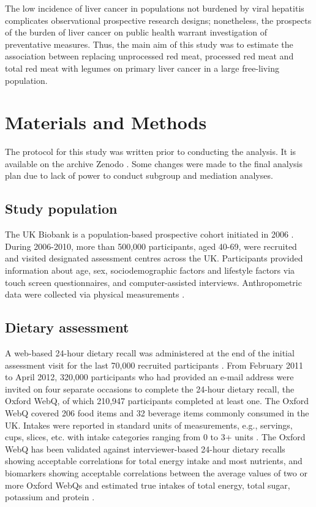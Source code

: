 \documentclass[
]{article}
\begin{document}
The low incidence of liver cancer in populations not burdened by viral
hepatitis complicates observational prospective research designs;
nonetheless, the prospects of the burden of liver cancer on public
health warrant investigation of preventative measures. Thus, the main
aim of this study was to estimate the association between replacing
unprocessed red meat, processed red meat and total red meat with legumes
on primary liver cancer in a large free-living population.

\hypertarget{sec2}{%
\section{Materials and Methods}\label{sec2}}

\noindent The protocol for this study was written prior to conducting
the analysis. It is available on the archive Zenodo \autocite{protocol}. Some
changes were made to the final analysis plan due to lack of power to
conduct subgroup and mediation analyses.

\hypertarget{subsec1}{%
\subsection{Study population}\label{subsec1}}

The UK Biobank is a population-based prospective cohort initiated in
2006 \autocite{sudlow2015}. During 2006-2010, more than 500,000 participants,
aged 40-69, were recruited and visited designated assessment centres
across the UK. Participants provided information about age, sex,
sociodemographic factors and lifestyle factors via touch screen
questionnaires, and computer-assisted interviews. Anthropometric data
were collected via physical measurements \autocite{RN113}.

\hypertarget{subsec2}{%
\subsection{Dietary assessment}\label{subsec2}}

A web-based 24-hour dietary recall was administered at the end of the
initial assessment visit for the last 70,000 recruited participants
\autocite{RN115}. From February 2011 to April 2012, 320,000 participants who had
provided an e-mail address were invited on four separate occasions to
complete the 24-hour dietary recall, the Oxford WebQ, of which 210,947
participants completed at least one. The Oxford WebQ covered 206 food
items and 32 beverage items commonly consumed in the UK. Intakes were
reported in standard units of measurements, e.g., servings, cups,
slices, etc. with intake categories ranging from 0 to 3+ units
\autocite{piernas2021}. The Oxford WebQ has been validated against
interviewer-based 24-hour dietary recalls showing acceptable
correlations for total energy intake and most nutrients, and biomarkers
showing acceptable correlations between the average values of two or
more Oxford WebQs and estimated true intakes of total energy, total
sugar, potassium and protein \autocite{Liu2011,Greenwood2019}.
\end{document}
